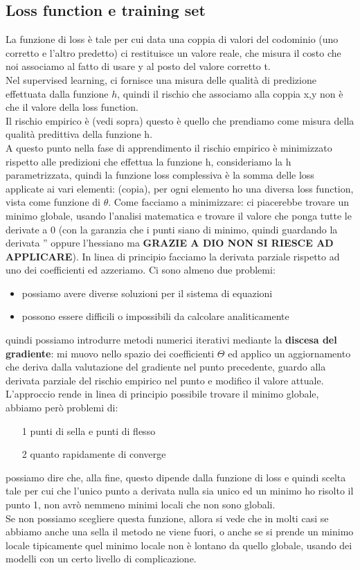 \documentclass[12pt, oneside]{extbook}
\begin{document}
\subsection{Loss function e training set}
La funzione di loss è tale per cui data una coppia di valori del codominio (uno corretto e l'altro predetto) ci restituisce un valore reale, che misura il costo che noi associamo al fatto di usare y al posto del valore corretto t.\\Nel supervised learning, ci fornisce una misura delle qualità di predizione effettuata dalla funzione $h$, quindi il rischio che associamo alla coppia x,y non è che il valore della loss function.\\Il rischio empirico è (vedi sopra) questo è quello che prendiamo come misura della qualità predittiva della funzione h.\\A questo punto nella fase di apprendimento il rischio empirico è minimizzato rispetto alle predizioni che effettua la funzione h, consideriamo la h parametrizzata, quindi la funzione loss complessiva è la somma delle loss applicate ai vari elementi: (copia), per ogni elemento ho una diversa loss function, vista come funzione di $\theta$. Come facciamo a minimizzare: ci piacerebbe trovare un minimo globale, usando l'analisi matematica e trovare il valore che ponga tutte le derivate a 0 (con la garanzia che i punti siano di minimo, quindi guardando la derivata '' oppure l'hessiano ma \textbf{GRAZIE A DIO NON SI RIESCE AD APPLICARE}). In linea di principio facciamo la derivata parziale rispetto ad uno dei coefficienti ed azzeriamo. Ci sono almeno due problemi:
\begin{itemize}
	\item possiamo avere diverse soluzioni per il sistema di equazioni
	\item possono essere difficili o impossibili da calcolare analiticamente
\end{itemize}
quindi possiamo introdurre metodi numerici iterativi mediante la \textbf{discesa del gradiente}: mi muovo nello spazio dei coefficienti $\Theta$ ed applico un aggiornamento che deriva dalla valutazione del gradiente nel punto precedente, guardo alla derivata parziale del rischio empirico nel punto e modifico il valore attuale.\\L'approccio rende in linea di principio possibile trovare il minimo globale, abbiamo però problemi di:
\begin{itemize}
	\item[1] punti di sella e punti di flesso
	\item[2] quanto rapidamente di converge
\end{itemize}
possiamo dire che, alla fine, questo dipende dalla funzione di loss e quindi scelta tale per cui che l'unico punto a derivata nulla sia unico ed un minimo ho risolto il punto 1, non avrò nemmeno minimi locali che non sono globali.\\Se non possiamo scegliere questa funzione, allora si vede che in molti casi se abbiamo anche una sella il metodo ne viene fuori, o anche se si prende un minimo locale tipicamente quel minimo locale non è lontano da quello globale, usando dei modelli con un certo livello di complicazione.
\end{document}
